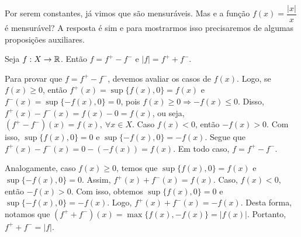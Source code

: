     \begin{figure}[h!]
	\centering
    \end{figure}    
    Por serem constantes, já vimos que são mensuráveis. Mas e a função $f(x) =\dfrac{|x|}{x}$ é mensurável?
    A resposta é sim e para mostrarmos isso precisaremos de algumas proposições auxiliares. 
    \begin{proposition}
    \label{prop:decomposicao-da-funcao-em-partes-positiva-negativa}
        Seja $f: X \to \mathbb{R}$. Então $f = f^+ - f^-$ e $|f| = f^+ + f^-$.
    \end{proposition}
    \begin{prova}
            Para provar que $f = f^+ - f^-$, devemos avaliar os casos de $f(x)$. 
            Logo, se $f(x) \geq 0$, então $f^+(x) = \sup\{f(x), 0\} = f(x)$ e $f^-(x) = \sup\{-f(x), 0\} = 0$, pois $f(x) \geq 0 \Rightarrow  - f(x) \leq 0$.
            Disso, $f^+(x) - f^-(x) = f(x) - 0 = f(x)$, ou seja, $(f^+ - f^-)(x) = f(x), \ \forall x \in X$.
            Caso $f(x) < 0$, então $- f(x) > 0$. 
            Com isso,  $\sup\{f(x), 0\} = 0$ e $\sup\{-f(x), 0\} = -f(x)$.
            Segue que 
            $f^+(x) - f^-(x) = 0 - (-f(x)) = f(x)$.
            Em todo caso, $f = f^+ - f^-$.

            Analogamente, caso $f(x) \geq 0$, temos que $\sup\{f(x), 0\} = f(x)$ e $\sup\{-f(x), 0\} = 0$.
            Assim, $f^+(x) + f^-(x) = f(x)$.
            Caso, $f(x) < 0$, então $ - f(x) > 0$.
            Com isso, obtemos $\sup\{f(x), 0\} = 0$ e $\sup\{-f(x), 0\} = -f(x)$.
            Logo, $f^+(x) + f^-(x) = -f(x)$.
            Desta forma, notamos que $(f^+ + f^-)(x) = \max\{f(x), -f(x)\} = |f(x)|$.
            Portanto, $f^+ + f^- = |f|$.
    \end{prova}

